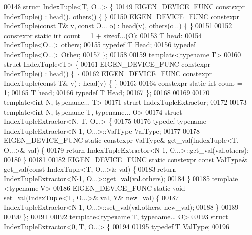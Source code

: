 \begin{DoxyCode}
00148 \textcolor{keyword}{struct }IndexTuple<T, O...> \{
00149   EIGEN\_DEVICE\_FUNC constexpr IndexTuple() : head(), others() \{ \}
00150   EIGEN\_DEVICE\_FUNC constexpr IndexTuple(\textcolor{keyword}{const} T& v, \textcolor{keyword}{const} O... o) : head(v), others(o...) \{ \}
00151 
00152   constexpr \textcolor{keyword}{static} \textcolor{keywordtype}{int} count = 1 + \textcolor{keyword}{sizeof}...(O);
00153   T head;
00154   IndexTuple<O...> others;
00155   \textcolor{keyword}{typedef} T Head;
00156   \textcolor{keyword}{typedef} IndexTuple<O...> Other;
00157 \};
00158 
00159 \textcolor{keyword}{template}<\textcolor{keyword}{typename} T>
00160   \textcolor{keyword}{struct }IndexTuple<T> \{
00161   EIGEN\_DEVICE\_FUNC constexpr IndexTuple() : head() \{ \}
00162   EIGEN\_DEVICE\_FUNC constexpr IndexTuple(\textcolor{keyword}{const} T& v) : head(v) \{ \}
00163 
00164   constexpr \textcolor{keyword}{static} \textcolor{keywordtype}{int} count = 1;
00165   T head;
00166   \textcolor{keyword}{typedef} T Head;
00167 \};
00168 
00169 
00170 \textcolor{keyword}{template}<\textcolor{keywordtype}{int} N, \textcolor{keyword}{typename}... T>
00171 \textcolor{keyword}{struct }IndexTupleExtractor;
00172 
00173 \textcolor{keyword}{template}<\textcolor{keywordtype}{int} N, \textcolor{keyword}{typename} T, \textcolor{keyword}{typename}... O>
00174 \textcolor{keyword}{struct }IndexTupleExtractor<N, T, O...> \{
00175 
00176   \textcolor{keyword}{typedef} \textcolor{keyword}{typename} IndexTupleExtractor<N-1, O...>::ValType ValType;
00177 
00178   EIGEN\_DEVICE\_FUNC \textcolor{keyword}{static} constexpr ValType& get\_val(IndexTuple<T, O...>& val) \{
00179     \textcolor{keywordflow}{return} IndexTupleExtractor<N-1, O...>::get\_val(val.others);
00180   \}
00181 
00182   EIGEN\_DEVICE\_FUNC \textcolor{keyword}{static} constexpr \textcolor{keyword}{const} ValType& get\_val(\textcolor{keyword}{const} IndexTuple<T, O...>& val) \{
00183     \textcolor{keywordflow}{return} IndexTupleExtractor<N-1, O...>::get\_val(val.others);
00184   \}
00185   \textcolor{keyword}{template} <\textcolor{keyword}{typename} V>
00186   EIGEN\_DEVICE\_FUNC \textcolor{keyword}{static} \textcolor{keywordtype}{void} set\_val(IndexTuple<T, O...>& val, V& new\_val) \{
00187     IndexTupleExtractor<N-1, O...>::set\_val(val.others, new\_val);
00188   \}
00189 
00190 \};
00191 
00192 \textcolor{keyword}{template}<\textcolor{keyword}{typename} T, \textcolor{keyword}{typename}... O>
00193   \textcolor{keyword}{struct }IndexTupleExtractor<0, T, O...> \{
00194 
00195   \textcolor{keyword}{typedef} T ValType;
00196 

\end{DoxyCode}
